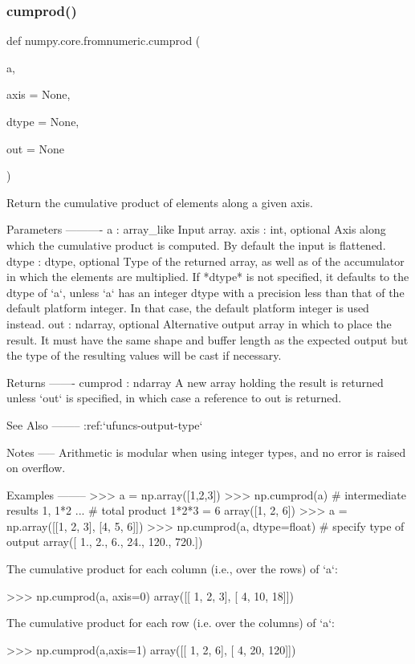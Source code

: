 \subsubsection{\texorpdfstring{cumprod()}{cumprod()}}
{\footnotesize\ttfamily def numpy.\+core.\+fromnumeric.\+cumprod (\begin{DoxyParamCaption}\item[{}]{a,  }\item[{}]{axis = {\ttfamily None},  }\item[{}]{dtype = {\ttfamily None},  }\item[{}]{out = {\ttfamily None} }\end{DoxyParamCaption})}

\begin{DoxyVerb}Return the cumulative product of elements along a given axis.

Parameters
----------
a : array_like
    Input array.
axis : int, optional
    Axis along which the cumulative product is computed.  By default
    the input is flattened.
dtype : dtype, optional
    Type of the returned array, as well as of the accumulator in which
    the elements are multiplied.  If *dtype* is not specified, it
    defaults to the dtype of `a`, unless `a` has an integer dtype with
    a precision less than that of the default platform integer.  In
    that case, the default platform integer is used instead.
out : ndarray, optional
    Alternative output array in which to place the result. It must
    have the same shape and buffer length as the expected output
    but the type of the resulting values will be cast if necessary.

Returns
-------
cumprod : ndarray
    A new array holding the result is returned unless `out` is
    specified, in which case a reference to out is returned.

See Also
--------
:ref:`ufuncs-output-type`

Notes
-----
Arithmetic is modular when using integer types, and no error is
raised on overflow.

Examples
--------
>>> a = np.array([1,2,3])
>>> np.cumprod(a) # intermediate results 1, 1*2
...               # total product 1*2*3 = 6
array([1, 2, 6])
>>> a = np.array([[1, 2, 3], [4, 5, 6]])
>>> np.cumprod(a, dtype=float) # specify type of output
array([   1.,    2.,    6.,   24.,  120.,  720.])

The cumulative product for each column (i.e., over the rows) of `a`:

>>> np.cumprod(a, axis=0)
array([[ 1,  2,  3],
       [ 4, 10, 18]])

The cumulative product for each row (i.e. over the columns) of `a`:

>>> np.cumprod(a,axis=1)
array([[  1,   2,   6],
       [  4,  20, 120]])\end{DoxyVerb}
 \mbox{\label{namespacenumpy_1_1core_1_1fromnumeric_ac9edcdc33c8976bbff52028d0bcee511}} 

